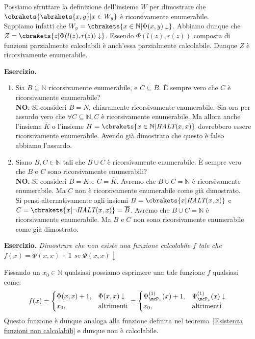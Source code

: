 Possiamo sfruttare la definizione dell'insieme \(W\) per dimostrare che \(\cbrakets{ \abrakets{ x,y } \vert x \in W_y}\) è ricorsivamente enumerabile.\\
Sappiamo infatti che \(W_y=\cbrakets{x \in \mathbb{N} \vert \Phi(x, y)\downarrow}\). Abbiamo dunque che \(Z=\cbrakets{z \vert \Phi(l(z),r(z))\downarrow}\). Essendo \(\Phi(l(z),r(z))\) composta di funzioni parzialmente calcolabili è anch'essa parzialmente calcolabile. Dunque \(Z\) è ricorsivamente enumerabile.

\textbf{Esercizio. } \begin{enumerate}
    \item Sia \(B\subseteq \mathbb{N}\) ricorsivamente enumerabile, e \(C \subseteq B\). È sempre vero che \(C\) è ricorsivamente enumerabile?\\
    \textbf{NO.} Si consideri \(B=N\), chiaramente ricorsivamente enumerabile. Sia ora per assurdo vero che \(\forall C \subseteq \mathbb{N}, C\) è ricorsivamente enumerabile. Ma allora anche l'insieme \(\overline{K}\) o l'insieme \(H=\cbrakets{x \in \mathbb{N} \vert \textit{HALT}(x,x)}\) dovrebbero essere ricorsivamente enumerabile. Avendo già dimostrato che questo è falso abbiamo l'assurdo.
    \item Siano \(B,C \in \mathbb{N}\) tali che \(B\cup C\) è ricorsivamente enumerabile. È sempre vero che \(B\) e \(C\) sono ricorsivamente enumerabili?\\
    \textbf{NO.} Si consideri \(B=K\) e \(C=\overline{K}\). Avremo che \(B\cup C = \mathbb{N}\) è ricorsivamente enumerabile. Ma \(C\) non è ricorsivamente enumerabile come già dimostrato.\\
    Si pensi alternativamente agli insiemi \(B=\cbrakets{x \vert \textit{HALT}(x,x)}\) e \(C=\cbrakets{x \vert \neg \textit{HALT}(x,x)}=\overline{B}\). Avremo che \(B\cup C = \mathbb{N}\) è ricorsivamente enumerabile. Ma \(B\) e \(C\) non sono ricorsivamente enumerabile come già dimostrato.
\end{enumerate}

\textbf{Esercizio. } \textit{Dimostrare che non esiste una funzione calcolabile \(f\) tale che \(f(x)=\Phi(x,x)+1\) se \(\Phi(x,x)\downarrow\)}

Fissando un \(x_0 \in \mathbb{N}\) qualsiasi possiamo esprimere una tale funzione \(f\) qualsiasi come:
\begin{equation}
    f(x)=\begin{cases}
        \Phi(x,x)+1, & \Phi(x,x)\downarrow\\
        x_0, & \text{altrimenti}
    \end{cases} = \begin{cases}
        \Psi_{\mcP_x}^{(1)}(x)+1, & \Psi_{\mcP_x}^{(1)}(x)\downarrow\\
        x_0, & \text{altrimenti}
    \end{cases}
\end{equation}
Questo funzione è dunque analoga alla funzione definita nel teorema~\ref{Esistenza funzioni non calcolabili} e dunque non è calcolabile.


